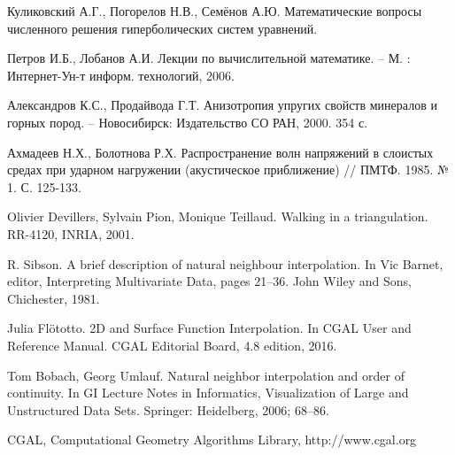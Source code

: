 \begin{thebibliography}{99}
 Куликовский А.Г., Погорелов Н.В., Семёнов А.Ю. Математические вопросы численного решения гиперболических систем уравнений.

 Петров И.Б., Лобанов А.И. Лекции по вычислительной математике. – М. : Интернет-Ун-т информ. технологий, 2006.

 Александров К.С., Продайвода Г.Т. Анизотропия упругих свойств минералов и горных пород. – Новосибирск: Издательство СО РАН, 2000. 354 с.

 Ахмадеев Н.Х., Болотнова Р.Х. Распространение волн напряжений в слоистых средах при ударном нагружении (акустическое приближение) // ПМТФ. 1985. № 1. С. 125-133.

 Olivier Devillers, Sylvain Pion, Monique Teillaud. Walking in a triangulation. RR-4120, INRIA, 2001.

 R. Sibson. A brief description of natural neighbour interpolation. In Vic Barnet, editor, Interpreting Multivariate Data, pages 21–36. John Wiley and Sons, Chichester, 1981.

 Julia Flötotto. 2D and Surface Function Interpolation. In CGAL User and Reference Manual. CGAL Editorial Board, 4.8 edition, 2016.

 Tom Bobach, Georg Umlauf. Natural neighbor interpolation and order of continuity. In GI Lecture Notes in Informatics, Visualization of Large and Unstructured Data Sets. Springer: Heidelberg, 2006; 68–86.

 CGAL, Computational Geometry Algorithms Library, http://www.cgal.org

\end{thebibliography}

